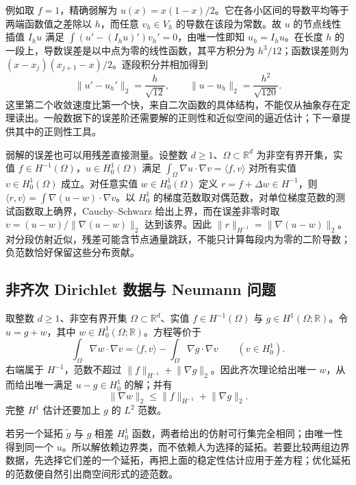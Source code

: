 \ProseParagraphBreak

例如取 \(f=1\)，精确弱解为 \(u(x)=x(1-x)/2\)。它在各小区间的导数平均等于两端函数值之差除以 \(h\)，而任意 \(v_h\in V_h\) 的导数在该段为常数。故 \(u\) 的节点线性插值 \(I_hu\) 满足 \(\int(u'- (I_hu)')v_h'=0\)，由唯一性即知 \(u_h=I_hu\)。在长度 \(h\) 的一段上，导数误差是以中点为零的线性函数，其平方积分为 \(h^3/12\)；函数误差则为 \((x-x_j)(x_{j+1}-x)/2\)。逐段积分并相加得到
\[\lVert u'-u_h'\rVert_2=\frac h{\sqrt{12}},\qquad
 \lVert u-u_h\rVert_2=\frac{h^2}{\sqrt{120}}.\]
这里第二个收敛速度比第一个快，来自二次函数的具体结构，不能仅从抽象存在定理读出。一般数据下的误差阶还需要解的正则性和近似空间的逼近估计；下一章提供其中的正则性工具。

\ProseParagraphBreak

弱解的误差也可以用残差直接测量。设整数 \(d\geq1\)、\(\Omega\subset\mathbb R^d\) 为非空有界开集，实值 \(f\in H^{-1}(\Omega)\)，\(u\in H_0^1(\Omega)\) 满足 \(\int_\Omega\nabla u\cdot\nabla v=\langle f,v\rangle\) 对所有实值 \(v\in H_0^1(\Omega)\) 成立。对任意实值 \(w\in H_0^1(\Omega)\) 定义 \(r=f+\Delta w\in H^{-1}\)，则 \(\langle r,v\rangle=\int\nabla(u-w)\cdot\nabla v\)。以 \(H_0^1\) 的梯度范数取对偶范数，对单位梯度范数的测试函数取上确界，Cauchy--Schwarz 给出上界，而在误差非零时取 \(v=(u-w)/\lVert\nabla(u-w)\rVert_2\) 达到该界。因此 \(\lVert r\rVert_{H^{-1}}=\lVert\nabla(u-w)\rVert_2\)。对分段仿射近似，残差可能含节点通量跳跃，不能只计算每段内为零的二阶导数；负范数恰好保留这些分布贡献。

\subsection{非齐次 Dirichlet 数据与 Neumann 问题}
\label{b2:subsec:150304}

取整数 \(d\geq1\)、非空有界开集 \(\Omega\subset\mathbb R^d\)、实值 \(f\in H^{-1}(\Omega)\) 与 \(g\in H^1(\Omega;\mathbb R)\)。令 \(u=g+w\)，其中 \(w\in H_0^1(\Omega;\mathbb R)\)。方程等价于
\[\int_\Omega\nabla w\cdot\nabla v
  =\langle f,v\rangle-\int_\Omega\nabla g\cdot\nabla v\qquad(v\in H_0^1).\]
右端属于 \(H^{-1}\)，范数不超过 \(\lVert f\rVert_{H^{-1}}+\lVert\nabla g\rVert_2\)。因此齐次理论给出唯一 \(w\)，从而给出唯一满足 \(u-g\in H_0^1\) 的解；并有
\[\lVert\nabla w\rVert_2\le\lVert f\rVert_{H^{-1}}+\lVert\nabla g\rVert_2.\]
完整 \(H^1\) 估计还要加上 \(g\) 的 \(L^2\) 范数。

\ProseParagraphBreak

若另一个延拓 \(\widetilde g\) 与 \(g\) 相差 \(H_0^1\) 函数，两者给出的仿射可行集完全相同；由唯一性得到同一个 \(u\)。所以解依赖边界类，而不依赖人为选择的延拓。若要比较两组边界数据，先选择它们差的一个延拓，再把上面的稳定性估计应用于差方程；优化延拓的范数便自然引出商空间形式的迹范数。


